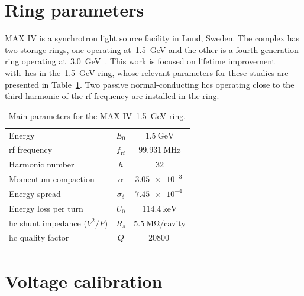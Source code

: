\documentclass[a4paper,
               ]{jacow}
\begin{document}
\section{Ring parameters}
MAX IV is a synchrotron light source facility in Lund, Sweden. The complex has two storage rings, one operating at~\SI{1.5}{\giga\electronvolt} and the other is a fourth-generation ring operating at~\SI{3.0}{\giga\electronvolt}~\cite{MAXIVreport}. This work is focused on lifetime improvement with~\glspl{hc} in the~\SI{1.5}{\giga\electronvolt} ring, whose relevant parameters for these studies are presented in Table~\ref{tab:params}. Two passive normal-conducting \glspl{hc} operating close to the third-harmonic of the rf frequency are installed in the ring.
\begin{table}[!hbt]
   \centering
    \caption{Main parameters for the MAX IV~\SI{1.5}{\giga\electronvolt} ring.}
   \begin{tabular}{lcc}
       \toprule
        Energy  & $E_0$  & $\SI{1.5}{\giga\electronvolt}$  \\
        rf frequency & $f_{\mathrm{rf}}$ & $\SI{99.931}{\mega\hertz}$ \\
        Harmonic number & $h$ & 32 \\
        Momentum compaction & $\alpha$ & $\SI{3.05e-3}{}$ \\
        Energy spread & $\sigma_\delta$ & $\SI{7.45e-4}{}$ \\
        Energy loss per turn& $U_0$ & $\SI{114.4}{\kilo\electronvolt}$ \\
        \gls{hc} shunt impedance ($V^2/P$) & $R_s$ & $\SI{5.5}{\mega\ohm}\slash$cavity \\
        \gls{hc} quality factor & $Q$ & $\SI{20800}{}$ \\
        \bottomrule
    \end{tabular}
    \label{tab:params}
\end{table}
\section{Voltage calibration}
\end{document}
